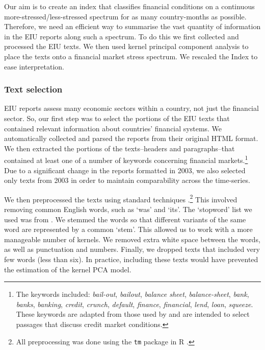 \documentclass[]{article}
\begin{document}
Our aim is to create an index that classifies financial conditions on a continuous more-stressed/less-stressed spectrum for as many country-months as possible. Therefore, we need an efficient way to summarise the vast quantity of information in the EIU reports along such a spectrum. To do this we first collected and processed the EIU texts. We then used kernel principal component analysis to place the texts onto a financial market stress spectrum. We rescaled the Index to ease interpretation.

\subsubsection{Text selection}\label{text-selection}

EIU reports assess many economic sectors within a country,
not just the financial sector. So, our first step was to select the portions of the EIU texts that contained relevant information about countries' financial systems. We automatically collected and parsed the reports from their original HTML format. We then extracted the portions of the texts--headers and paragraphs--that contained at least one of a number of keywords concerning financial markets.\footnote{The
  keywords included: \emph{bail-out}, \emph{bailout}, \emph{balance
  sheet}, \emph{balance-sheet}, \emph{bank}, \emph{banks},
  \emph{banking}, \emph{credit}, \emph{crunch}, \emph{default},
  \emph{finance}, \emph{financial}, \emph{lend}, \emph{loan},
  \emph{squeeze}. These keywords are adapted
  from those used by \cite{Romer2015} and are intended to
  select passages that discuss credit market conditions.} Due to a significant change in the reports formatted in 2003, we also
selected only texts from 2003 in order to maintain comparability across the time-series.

We then preprocessed the texts using standard techniques \citep[see][]{Grimmer2013}.\footnote{All preprocessing was done using the \texttt{tm} package \citep{tm2015} in R \citep{R-cite}.} This involved removing common English words, such as `was' and `its'. The `stopword' list we used was from \cite{dhillon:modha:mlj01}. We stemmed the words so that different variants of the same word are represented by a common `stem'. This allowed us to work with a more manageable number of kernels.  We removed extra white space between the words, as well as punctuation and numbers. Finally, we dropped texts that included very few words (less than six). In practice, including these texts would have prevented the estimation of the kernel PCA model.
\end{document}
